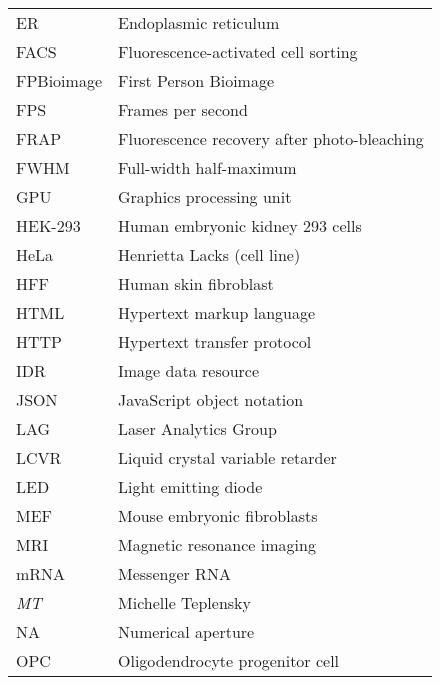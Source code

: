 \begin{flushleft}
\begin{longtable}[l]{|p{5.5em}|p{25em}|}
ER         & Endoplasmic reticulum                                      \\
FACS       & Fluorescence-activated cell sorting                        \\
FPBioimage & First Person Bioimage                                      \\
FPS        & Frames per second                                          \\
FRAP       & Fluorescence recovery after photo-bleaching                \\
FWHM       & Full-width half-maximum                                    \\
GPU        & Graphics processing unit                                   \\
HEK-293    & Human embryonic kidney 293 cells                           \\
HeLa       & Henrietta Lacks (cell line)                                \\
HFF        & Human skin fibroblast                                      \\
HTML       & Hypertext markup language                                  \\
HTTP       & Hypertext transfer protocol                                \\
IDR        & Image data resource                                        \\
JSON       & JavaScript object notation                                 \\
LAG        & Laser Analytics Group                                      \\
LCVR       & Liquid crystal variable retarder                           \\
LED        & Light emitting diode                                       \\
MEF        & Mouse embryonic fibroblasts                                \\
MRI        & Magnetic resonance imaging                                \\
mRNA       & Messenger RNA                                              \\
\textit{MT} & Michelle Teplensky                                         \\
NA         & Numerical aperture                                         \\
OPC        & Oligodendrocyte progenitor cell                            \\

\end{longtable}
\end{flushleft}
